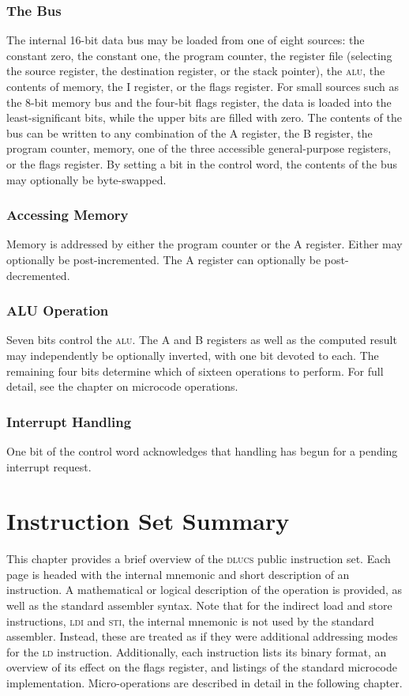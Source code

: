 \documentclass[11pt]{book}
\begin{document}
\subsection{The Bus}
The internal 16-bit data bus may be loaded from one of eight sources:
the constant zero,
the constant one,
the program counter,
the register file
(selecting the source register,
 the destination register,
 or the stack pointer),
the \textsc{alu},
the contents of memory,
the I register, or
the flags register.
For small sources such as the 8-bit memory bus
and the four-bit flags register,
the data is loaded into the least-significant bits,
while the upper bits are filled with zero.
The contents of the bus can be written to any combination of
the A register,
the B register,
the program counter,
memory,
one of the three accessible general-purpose registers,
or the flags register.
By setting a bit in the control word,
the contents of the bus may optionally be byte-swapped.

\subsection{Accessing Memory}
Memory is addressed by either the program counter or the A register.
Either may optionally be post-incremented.
The A register can optionally be post-decremented.

\subsection{ALU Operation}
Seven bits control the \textsc{alu}.
The A and B registers as well as the computed result
may independently be optionally inverted,
with one bit devoted to each.
The remaining four bits determine
which of sixteen operations to perform.
For full detail, see the chapter on microcode operations.

\subsection{Interrupt Handling}
One bit of the control word acknowledges
that handling has begun for a pending interrupt request.


\chapter{Instruction Set Summary}
This chapter provides a brief overview
of the \textsc{dlucs} public instruction set.
Each page is headed with the internal mnemonic and short description
of an instruction.
A mathematical or logical description of the operation is provided,
as well as the standard assembler syntax.
Note that for the indirect load and store instructions,
\textsc{ldi} and \textsc{sti},
the internal mnemonic is not used by the standard assembler.
Instead, these are treated as if they were additional addressing modes
for the \textsc{ld} instruction.
Additionally, each instruction lists its binary format,
an overview of its effect on the flags register,
and listings of the standard microcode implementation.
Micro-operations are described in detail in the following chapter.
\end{document}

